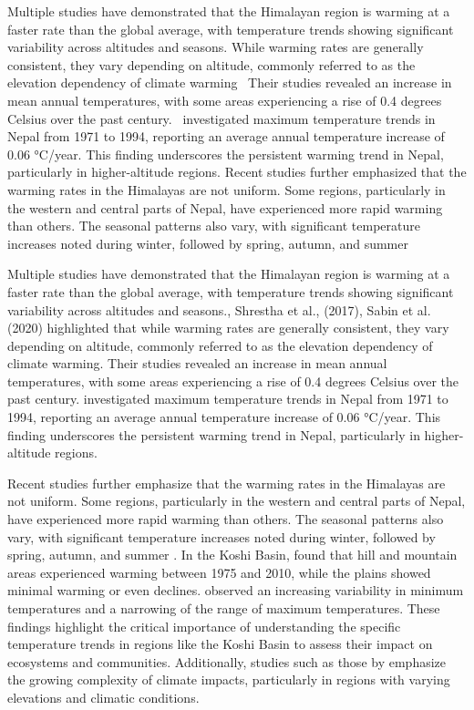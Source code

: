 Multiple studies have demonstrated that the Himalayan region is warming at a faster rate than the global average, with temperature trends showing significant variability across altitudes and seasons. While warming rates are generally consistent, they vary depending on altitude, commonly referred to as the elevation dependency of climate warming~\textcite{hingane_longterm_1985,shrestha_observed_2017,Sabin2020,} Their studies revealed an increase in mean annual temperatures, with some areas experiencing a rise of 0.4 degrees Celsius over the past century.~\textcite{shrestha_maximum_1999} investigated maximum temperature trends in Nepal from 1971 to 1994, reporting an average annual temperature increase of 0.06 °C/year. This finding underscores the persistent warming trend in Nepal, particularly in higher-altitude regions. Recent studies further emphasized that the warming rates in the Himalayas are not uniform. Some regions, particularly in the western and central parts of Nepal, have experienced more rapid warming than others. The seasonal patterns also vary, with significant temperature increases noted during winter, followed by spring, autumn, and summer


Multiple studies have demonstrated that the Himalayan region is warming at a faster rate than the global average, with temperature trends showing significant variability across altitudes and seasons.\textcite{hingane_longterm_1985,shrestha_observed_2017, Sabin2020}, Shrestha et al., (2017), Sabin et al. (2020) highlighted that while warming rates are generally consistent, they vary depending on altitude, commonly referred to as the elevation dependency of climate warming. Their studies revealed an increase in mean annual temperatures, with some areas experiencing a rise of 0.4 degrees Celsius over the past century.\textcite{shrestha_maximum_1999} investigated maximum temperature trends in Nepal from 1971 to 1994, reporting an average annual temperature increase of 0.06 °C/year. This finding underscores the persistent warming trend in Nepal, particularly in higher-altitude regions.


Recent studies further emphasize that the warming rates in the Himalayas are not uniform. Some regions, particularly in the western and central parts of Nepal, have experienced more rapid warming than others. The seasonal patterns also vary, with significant temperature increases noted during winter, followed by spring, autumn, and summer \parencite{agarwal_analysis_2016}. In the Koshi Basin, \textcite{shrestha_observed_2017}  found that hill and mountain areas experienced warming between 1975 and 2010, while the plains showed minimal warming or even declines.\textcite{bastakoti_agriculture_2017} observed an increasing variability in minimum temperatures and a narrowing of the range of maximum temperatures. These findings highlight the critical importance of understanding the specific temperature trends in regions like the Koshi Basin to assess their impact on ecosystems and communities. Additionally, studies such as those by\textcite{poudel_spatiotemporal_2020} emphasize the growing complexity of climate impacts, particularly in regions with varying elevations and climatic conditions.


